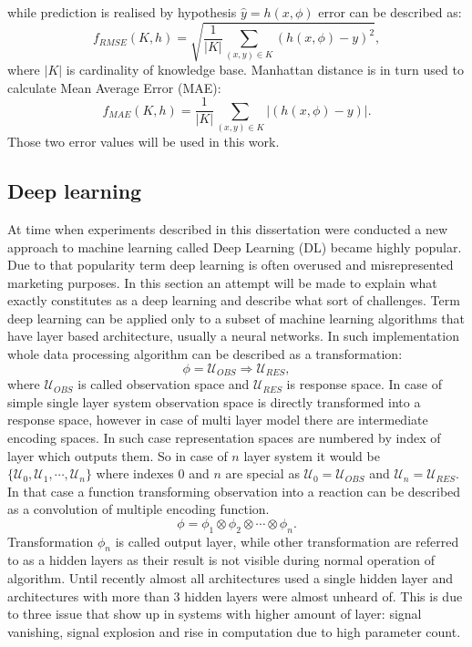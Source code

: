 while prediction is realised by hypothesis $\hat{y} = h(x,\phi)$ error can be described as:
\begin{equation}
	\label{equ:mse}
	f_{RMSE}(K,h) = \sqrt{\frac{1}{\vert K \vert} \sum_{(x,y) \in K}(h(x,\phi)-y)^2},
\end{equation}
where $\vert K \vert$ is cardinality of knowledge base.
Manhattan distance is in turn used to calculate Mean Average Error (MAE):
\begin{equation}
	\label{equ:mae}
	f_{MAE}(K,h) = \frac{1}{\vert K \vert} \sum_{(x,y) \in K}\vert (h(x,\phi)-y)\vert.
\end{equation}
Those two error values will be used in this work.


\subsection{Deep learning}
\FloatBarrier
At time when experiments described in this dissertation were conducted a new approach to 
machine learning called Deep Learning (DL) became highly popular.
Due to that popularity term deep learning is often overused and misrepresented marketing 
purposes. In this section an attempt will be made to explain what exactly constitutes as a
deep learning and describe what sort of challenges.
Term deep learning can be applied only to a subset of machine learning algorithms that have
layer based architecture, usually a neural networks.
In such implementation whole data processing algorithm can be described as a transformation:
\begin{equation}
	\label{equ:spaces1}
	\phi = \mathcal{U}_{OBS} \Rightarrow \mathcal{U}_{RES},
\end{equation}
where $\mathcal{U}_{OBS}$ is called observation space and $\mathcal{U}_{RES}$ is response space.
In case of simple single layer system observation space is directly transformed into a 
response space, however in case of multi layer model there are intermediate encoding spaces.
In such case representation spaces are numbered by index of layer which outputs them. 
So in case of $n$ layer system it would be $\{\mathcal{U}_{0}, \mathcal{U}_{1},
\cdots, \mathcal{U}_{n}\}$ where indexes $0$ and $n$ are special as 
$\mathcal{U}_{0}=\mathcal{U}_{OBS}$ and $\mathcal{U}_{n}=\mathcal{U}_{RES}$.
In that case a function transforming observation into a reaction can be described as a 
convolution of multiple encoding function.
\begin{equation}
	\label{equ:spaces_transform}
	\phi = \phi_{1} \otimes \phi_{2} \otimes \cdots \otimes \phi_{n}.
\end{equation}
Transformation $\phi_{n}$ is called output layer, while other transformation are referred to
as a hidden layers as their result is not visible during normal operation of algorithm.
Until recently almost all architectures used a single hidden layer and architectures with more
than 3 hidden layers were almost unheard of.
This is due to three issue that show up in systems with higher amount of layer: signal vanishing,
signal explosion and rise in computation due to high parameter count.



